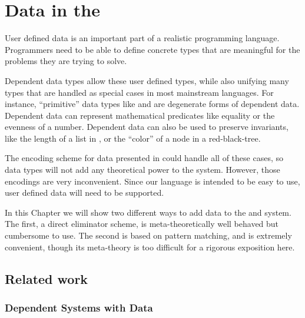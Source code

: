 \chapter{Data in the \SLang{}}
\label{chapter:SurfaceData}
\thispagestyle{myheadings}

User defined data is an important part of a realistic programming language.
Programmers need to be able to define concrete types that are meaningful for the problems they are trying to solve.

Dependent data types allow these user defined types, while also unifying many types that are handled as special cases in most mainstream languages.
For instance, ``primitive'' data types like \Nat{} and \Bool{} are degenerate forms of dependent data.
Dependent data can represent mathematical predicates like equality or the evenness of a number.
Dependent data can also be used to preserve invariants, like the length of a list in \Vect{}, or the ``color'' of a node in a red-black-tree.

The encoding scheme for data presented in  could handle all of these cases, so data types will not add any theoretical power to the system.
However, those encodings are very inconvenient. 
Since our language is intended to be easy to use, user defined data will need to be supported.

In this Chapter we will show two different ways to add data to the \slang{} and \bidir{} system.
The first, a direct eliminator scheme, is meta-theoretically well behaved but cumbersome to use.
The second is based on pattern matching, and is extremely convenient, though its meta-theory is too difficult for a rigorous exposition here.






\section{Related work}

\subsection{Dependent Systems with Data}


